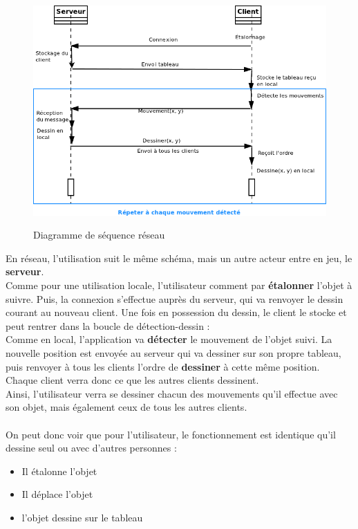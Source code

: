 \documentclass{report}
\begin{document}
				\newpage
				\begin{figure}[!h]
						\centering
						\includegraphics[scale=0.6]{../images/sequence_reseau.png}\\
						\caption{Diagramme de séquence réseau}
						\label{Diagramme de séquence réseau}
				\end{figure}
				En réseau, l'utilisation suit le même schéma, mais un autre acteur entre en jeu, le \textbf{serveur}. \\
				Comme pour une utilisation locale, l'utilisateur comment par \textbf{étalonner} l'objet à suivre. Puis, la connexion s'effectue auprès du serveur, qui va renvoyer le dessin courant au nouveau client. Une fois en possession du dessin, le client le stocke et peut rentrer dans la boucle de détection-dessin : \\
				Comme en local, l'application va \textbf{détecter} le mouvement de l'objet suivi. La nouvelle position est envoyée au serveur qui va dessiner sur son propre tableau, puis renvoyer à tous les clients l'ordre de \textbf{dessiner} à cette même position. Chaque client verra donc ce que les autres clients dessinent. \\
				Ainsi, l'utilisateur verra se dessiner chacun des mouvements qu'il effectue avec son objet, mais également ceux de tous les autres clients.
				\\ $$$$ \\
				On peut donc voir que pour l'utilisateur, le fonctionnement est identique qu'il dessine seul ou avec d'autres personnes :
				\begin{itemize}
					\item Il étalonne l'objet
					\item Il déplace l'objet
					\item l'objet dessine sur le tableau
				\end{itemize}
				
\end{document}
